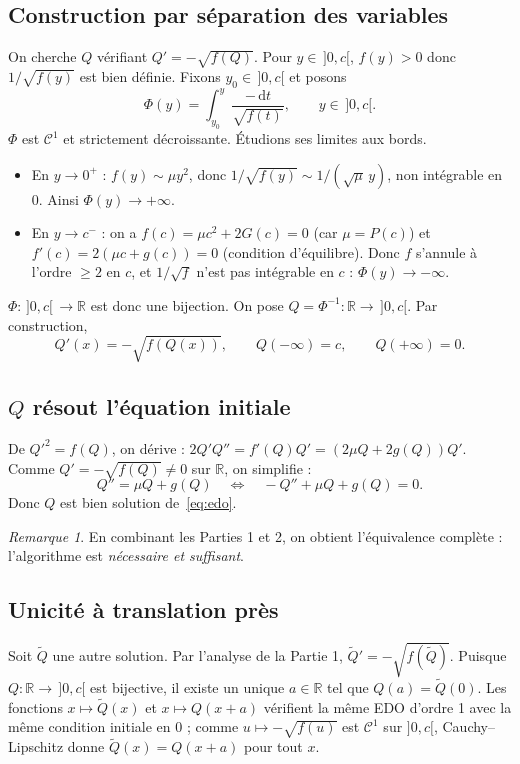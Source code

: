 \documentclass[11pt,a4paper]{article}
\theoremstyle{plain}
\theoremstyle{remark}
\newtheorem*{remarque}{Remarque}
\newcommand{\R}{\mathbb{R}}
\newcommand{\dd}{\,\mathrm{d}}
\begin{document}
\subsection{Construction par séparation des variables}
On cherche $Q$ vérifiant $Q'=-\sqrt{f(Q)}$. Pour $y\in\,]0,c[$, $f(y)>0$ donc
$1/\sqrt{f(y)}$ est bien définie. Fixons $y_0\in\,]0,c[$ et posons
\[
  \Phi(y)=\int_{y_0}^{y}\frac{-\dd t}{\sqrt{f(t)}},\qquad y\in\,]0,c[.
\]
$\Phi$ est $\mathcal{C}^1$ et strictement décroissante. Étudions ses limites aux
bords.
\begin{itemize}[leftmargin=1.6em]
  \item En $y\to0^+$ : $f(y)\sim\mu y^2$, donc $1/\sqrt{f(y)}\sim 1/(\sqrt{\mu}\,y)$,
  non intégrable en $0$. Ainsi $\Phi(y)\to+\infty$.
  \item En $y\to c^-$ : on a $f(c)=\mu c^2+2G(c)=0$ (car $\mu=P(c)$) et
  $f'(c)=2(\mu c+g(c))=0$ (condition d'équilibre). Donc $f$ s'annule à l'ordre
  $\ge2$ en $c$, et $1/\sqrt{f}$ n'est pas intégrable en $c$ : $\Phi(y)\to-\infty$.
\end{itemize}
$\Phi:\,]0,c[\,\to\R$ est donc une bijection. On pose $Q=\Phi^{-1}:\R\to\,]0,c[$.
Par construction,
\[
  Q'(x)=-\sqrt{f(Q(x))},\qquad Q(-\infty)=c,\qquad Q(+\infty)=0.
\]

\subsection{$Q$ résout l'équation initiale}
De $Q'^2=f(Q)$, on dérive : $2Q'Q''=f'(Q)Q'=(2\mu Q+2g(Q))Q'$. Comme
$Q'=-\sqrt{f(Q)}\neq0$ sur $\R$, on simplifie :
\[
  Q''=\mu Q+g(Q)\quad\Longleftrightarrow\quad -Q''+\mu Q+g(Q)=0.
\]
Donc $Q$ est bien solution de~\eqref{eq:edo}.

\begin{remarque}
En combinant les Parties 1 et 2, on obtient l'équivalence complète : l'algorithme
est \emph{nécessaire et suffisant}.
\end{remarque}

\subsection{Unicité à translation près}
Soit $\widetilde Q$ une autre solution. Par l'analyse de la Partie 1,
$\widetilde Q'=-\sqrt{f(\widetilde Q)}$. Puisque $Q:\R\to\,]0,c[$ est bijective,
il existe un unique $a\in\R$ tel que $Q(a)=\widetilde Q(0)$. Les fonctions
$x\mapsto\widetilde Q(x)$ et $x\mapsto Q(x+a)$ vérifient la même EDO d'ordre 1
avec la même condition initiale en $0$ ; comme $u\mapsto-\sqrt{f(u)}$ est
$\mathcal{C}^1$ sur $]0,c[$, Cauchy–Lipschitz donne
$\widetilde Q(x)=Q(x+a)$ pour tout $x$.
\end{document}
